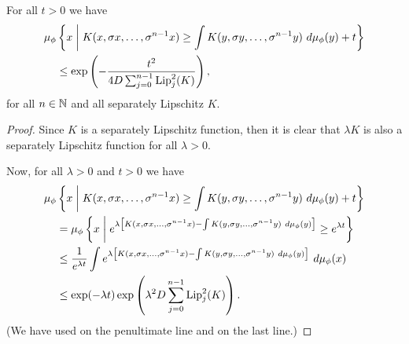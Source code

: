 \begin{corollary}\label{cor:cm-3-1}
	For all $t > 0$ we have
	\begin{align}\label{fml:cm-4}
		\mu_\phi&\left\{x \midmid K(x, \sigma{x}, \dots, \sigma^{n - 1}{x}) \geq \int{K(y, \sigma{y}, \dots, \sigma^{n - 1}{y})\ d\mu_\phi(y)} + t\right\} \nonumber \\
			&\leq \exp\left(-\frac{t^2}{4D\sum_{j = 0}^{n - 1}{\Lip_j^2(K)}}\right),
	\end{align}
	for all $n \in \mathbb{N}$ and all separately Lipschitz $K$.
	\begin{proof}
		Since $K$ is a separately Lipschitz function, then it is clear that $\lambda K$ is also a separately Lipschitz function for all $\lambda > 0$.
		
		Now, for all $\lambda > 0$ and $t > 0$ we have
		\begin{align}
			\mu_\phi&\left\{x \midmid K(x, \sigma{x}, \dots, \sigma^{n - 1}{x}) \geq \int{K(y, \sigma{y}, \dots, \sigma^{n - 1}{y})\ d\mu_\phi(y)} + t\right\} \nonumber \\
				&= \mu_\phi\left\{x \midmid e^{\lambda\left[K(x, \sigma{x}, \dots, \sigma^{n - 1}{x}) - \int{K(y, \sigma{y}, \dots, \sigma^{n - 1}{y})\ d\mu_\phi(y)}\right]} \geq e^{\lambda t}\right\} \nonumber \\
				&\leq \frac{1}{e^{\lambda t}} \int{e^{\lambda\left[K(x, \sigma{x}, \dots, \sigma^{n - 1}{x}) - \int{K(y, \sigma{y}, \dots, \sigma^{n - 1}{y})\ d\mu_\phi(y)}\right]}\ d\mu_\phi(x)} \nonumber \\
				& \leq \exp(-\lambda t) \exp\left(\lambda^2 D \sum_{j = 0}^{n - 1}{\Lip_j^2(K)}\right). \label{fml:cor-3-1-exp}
		\end{align}
		(We have used  on the penultimate line and  on the last line.)
		

\end{proof}
\end{corollary}
